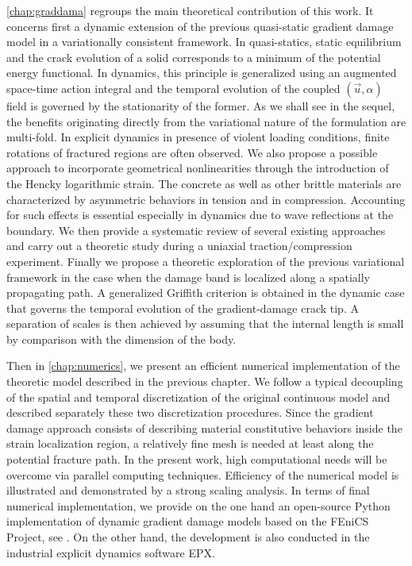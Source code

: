 \cref{chap:graddama} regroups the main theoretical contribution of this work. It concerns first a dynamic extension of the previous quasi-static gradient damage model in a variationally consistent framework. In quasi-statics, static equilibrium and the crack evolution of a solid corresponds to a minimum of the potential energy functional. In dynamics, this principle is generalized using an augmented space-time action integral and the temporal evolution of the coupled $(\vec{u},\alpha)$ field is governed by the stationarity of the former. As we shall see in the sequel, the benefits originating directly from the variational nature of the formulation are multi-fold. In explicit dynamics in presence of violent loading conditions, finite rotations of fractured regions are often observed. We also propose a possible approach to incorporate geometrical nonlinearities through the introduction of the Hencky logarithmic strain. The concrete as well as other brittle materials are characterized by asymmetric behaviors in tension and in compression. Accounting for such effects is essential especially in dynamics due to wave reflections at the boundary. We then provide a systematic review of several existing approaches and carry out a theoretic study during a uniaxial traction/compression experiment. Finally we propose a theoretic exploration of the previous variational framework in the case when the damage band is localized along a spatially propagating path. A generalized Griffith criterion is obtained in the dynamic case that governs the temporal evolution of the gradient-damage crack tip. A separation of scales is then achieved by assuming that the internal length is small by comparison with the dimension of the body.

Then in \cref{chap:numerics}, we present an efficient numerical implementation of the theoretic model described in the previous chapter. We follow a typical decoupling of the spatial and temporal discretization of the original continuous model and described separately these two discretization procedures. Since the gradient damage approach consists of describing material constitutive behaviors inside the strain localization region, a relatively fine mesh is needed at least along the potential fracture path. In the present work, high computational needs will be overcome via parallel computing techniques. Efficiency of the numerical model is illustrated and demonstrated by a strong scaling analysis. In terms of final numerical implementation, we provide on the one hand an open-source Python implementation of dynamic gradient damage models based on the FEniCS Project, see \cite{LiMaurini:2015}. On the other hand, the development is also conducted in the industrial explicit dynamics software EPX.

